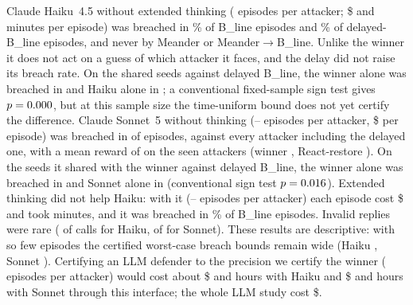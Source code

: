 Claude Haiku~4.5 without extended thinking (\HnPer{} episodes per attacker; \$\HnCostEp{}
and \HnMinutes{} minutes per episode) was breached in \HnBlineBreach\% of B\_line
episodes and \HnDelayedBreach\% of delayed-B\_line episodes, and never by Meander or
Meander$\to$B\_line. Unlike the winner it does not act on a guess of which attacker it
faces, and the delay did not raise its breach rate. On the \HnPairN{} shared seeds
against delayed B\_line, the winner alone was breached in \HnPairOnlyChamp{} and Haiku
alone in \HnPairOnlyLlm; a conventional fixed-sample sign test gives $p=0.000$, but at
this sample size the time-uniform bound does not yet certify the difference. Claude
Sonnet~5 without thinking (\SnPer--\SnMax{} episodes per attacker, \$\SnCostEp{} per
episode) was breached in \SnBreaches{} of \SnEpisodes{} episodes, against every attacker
including the delayed one, with a mean reward of \SnSeenReward{} on the seen attackers
(winner \CgChampSeenReward, React-restore \CgRestoreSeenReward). On the \SnPairN{} seeds it
shared with the winner against delayed B\_line, the winner alone was breached in
\SnPairOnlyChamp{} and Sonnet alone in \SnPairOnlyLlm{} (conventional sign test
$p=0.016$). Extended thinking did not
help Haiku: with it (\HtPer--\HtMax{} episodes per attacker) each episode cost \$\HtCostEp{}
and took \HtMinutes{} minutes, and it was breached in \HtBlineBreach\% of B\_line
episodes. Invalid replies were rare (\HnInvalid{} of \HnCalls{} calls for Haiku,
\SnInvalid{} of \SnCalls{} for Sonnet). These results are descriptive: with so few
episodes the certified worst-case breach bounds remain wide (Haiku \HnAllBreachCert,
Sonnet \SnAllBreachCert). Certifying an LLM defender to the precision we certify the
winner (\CgEpisodes{} episodes per attacker) would cost about \$\HnCertCost{} and
\HnCertHours{} hours with Haiku and \$\SnCertCost{} and \SnCertHours{} hours with Sonnet
through this interface; the whole LLM study cost \$\CgLlmCost.
